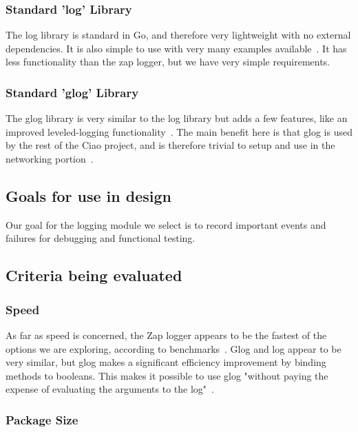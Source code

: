 \documentclass[10pt,letterpaper,onecolumn,draftclsnofoot]{IEEEtran}
\begin{document}
\subsubsection{Standard 'log' Library}

The log library is standard in Go, and therefore very lightweight with no
external dependencies. It is also simple to use with very many examples
available~\cite{log}. It has less functionality than the zap logger, but we have
very simple requirements.

\subsubsection{Standard 'glog' Library}

The glog library is very similar to the log library but adds a few features,
like an improved leveled-logging functionality~\cite{glog}. The main benefit
here is that glog is used by the rest of the Ciao project, and is therefore
trivial to setup and use in the networking portion~\cite{ciao}.

\subsection{Goals for use in design}

Our goal for the logging module we select is to record important events and
failures for debugging and functional testing.

\subsection{Criteria being evaluated}

\subsubsection{Speed}

As far as speed is concerned, the Zap logger appears to be the fastest of the
options we are exploring, according to benchmarks~\cite{zap}. Glog and log
appear to be very similar, but glog makes a significant efficiency improvement
by binding methods to booleans. This makes it possible to use glog "without
paying the expense of evaluating the arguments to the log"~\cite{glog}.

\subsubsection{Package Size}
\end{document}
